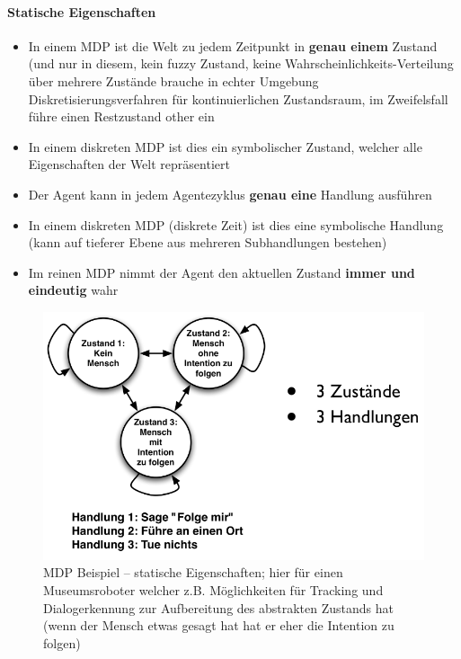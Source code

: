 \paragraph{Statische Eigenschaften}
\begin{itemize}
	\item In einem MDP ist die Welt zu jedem Zeitpunkt in \textbf{genau einem} Zustand (und nur in diesem, kein fuzzy Zustand, keine Wahrscheinlichkeits-Verteilung über mehrere Zustände
	\ita brauche in echter Umgebung Diskretisierungsverfahren für kontinuierlichen Zustandsraum, im Zweifelsfall führe einen Restzustand \glqq other\grqq{} ein
	\item In einem diskreten MDP ist dies ein symbolischer Zustand, welcher alle Eigenschaften der Welt repr\"asentiert
	\item Der Agent kann in jedem Agentezyklus \textbf{genau eine} Handlung ausf\"uhren
	\item In einem diskreten MDP (diskrete Zeit) ist dies eine symbolische Handlung (kann auf tieferer Ebene aus mehreren Subhandlungen bestehen)
	\item Im reinen MDP nimmt der Agent den aktuellen Zustand \textbf{immer und eindeutig} wahr
\end{itemize}
\begin{figure}[!h]
	\centering
  	\includegraphics[width=0.5\linewidth]{figures/ch07_stat-bsp.png}
	\caption{MDP Beispiel -- statische Eigenschaften; hier für einen Museumsroboter welcher z.B. Möglichkeiten für Tracking und Dialogerkennung zur Aufbereitung des abstrakten Zustands hat (wenn der Mensch etwas gesagt hat hat er eher die Intention zu folgen)}
	\label{fig:ch07:stat-bsp}
\end{figure}
